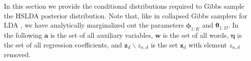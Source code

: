
\label{sec:inference}

In this section we provide the conditional distributions required to Gibbs sample the HSLDA posterior distribution.  Note that, like in collapsed Gibbs samplers for LDA \cite{Griffiths04}, we have analytically marginalized out the parameters $\boldsymbol{\phi}_{1:K}$
and $\boldsymbol{\theta}_{1:D}.$   In the following $\mathbf{a}$ is the set of all auxiliary variables, $\mathbf{w}$ is the set of all words, $\boldsymbol\eta$ is the set of all regression coefficients, and  $\mathbf{z}_d\backslash z_{n,d}$ is the set $\mathbf{z}_d$ with element $z_{n,d}$ removed.
%
%

